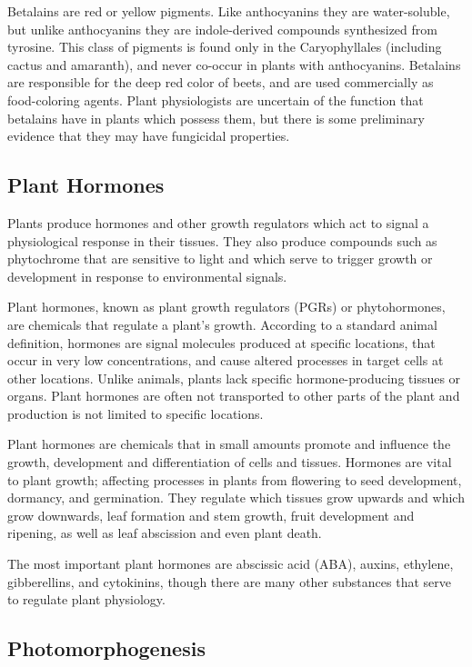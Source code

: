 Betalains are red or yellow pigments. Like anthocyanins they are water-soluble, but unlike anthocyanins they are indole-derived compounds synthesized from tyrosine. This class of pigments is found only in the Caryophyllales (including cactus and amaranth), and never co-occur in plants with anthocyanins. Betalains are responsible for the deep red color of beets, and are used commercially as food-coloring agents. Plant physiologists are uncertain of the function that betalains have in plants which possess them, but there is some preliminary evidence that they may have fungicidal properties.

\hypertarget{plant-hormones}{%
\subsection{Plant Hormones}\label{plant-hormones}}

Plants produce hormones and other growth regulators which act to signal a physiological response in their tissues. They also produce compounds such as phytochrome that are sensitive to light and which serve to trigger growth or development in response to environmental signals.

Plant hormones, known as plant growth regulators (PGRs) or phytohormones, are chemicals that regulate a plant's growth. According to a standard animal definition, hormones are signal molecules produced at specific locations, that occur in very low concentrations, and cause altered processes in target cells at other locations. Unlike animals, plants lack specific hormone-producing tissues or organs. Plant hormones are often not transported to other parts of the plant and production is not limited to specific locations.

Plant hormones are chemicals that in small amounts promote and influence the growth, development and differentiation of cells and tissues. Hormones are vital to plant growth; affecting processes in plants from flowering to seed development, dormancy, and germination. They regulate which tissues grow upwards and which grow downwards, leaf formation and stem growth, fruit development and ripening, as well as leaf abscission and even plant death.

The most important plant hormones are abscissic acid (ABA), auxins, ethylene, gibberellins, and cytokinins, though there are many other substances that serve to regulate plant physiology.

\hypertarget{photomorphogenesis}{%
\subsection{Photomorphogenesis}\label{photomorphogenesis}}

